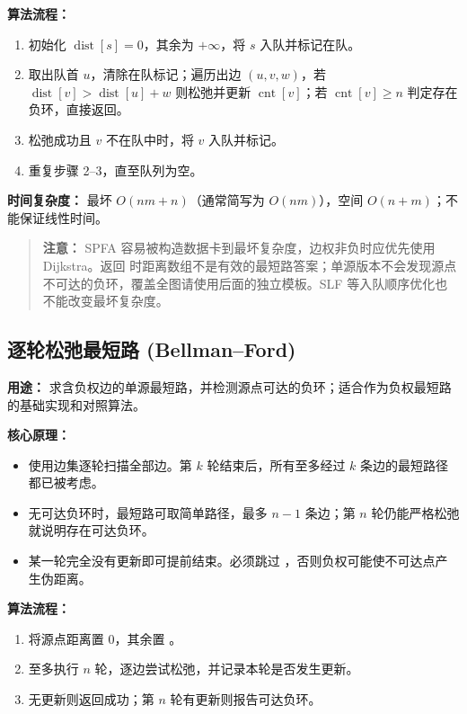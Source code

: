 \textbf{算法流程：}

\begin{enumerate}
  \item 初始化 $\operatorname{dist}[s] = 0$，其余为 $+\infty$，将 $s$ 入队并标记在队。
  \item 取出队首 $u$，清除在队标记；遍历出边 $(u, v, w)$，若 $\operatorname{dist}[v] > \operatorname{dist}[u] + w$ 则松弛并更新 $\operatorname{cnt}[v]$；若 $\operatorname{cnt}[v] \ge n$ 判定存在负环，直接返回。
  \item 松弛成功且 $v$ 不在队中时，将 $v$ 入队并标记。
  \item 重复步骤 2--3，直至队列为空。
\end{enumerate}

\textbf{时间复杂度：} 最坏 $O(nm+n)$（通常简写为 $O(nm)$），空间 $O(n+m)$；不能保证线性时间。

\begin{quote}
\textbf{注意：} SPFA 容易被构造数据卡到最坏复杂度，边权非负时应优先使用 Dijkstra。返回  时距离数组不是有效的最短路答案；单源版本不会发现源点不可达的负环，覆盖全图请使用后面的独立模板。SLF 等入队顺序优化也不能改变最坏复杂度。
\end{quote}



\subsection{逐轮松弛最短路 (Bellman--Ford)}

\textbf{用途：} 求含负权边的单源最短路，并检测源点可达的负环；适合作为负权最短路的基础实现和对照算法。

\textbf{核心原理：}
\begin{itemize}
  \item 使用边集逐轮扫描全部边。第 $k$ 轮结束后，所有至多经过 $k$ 条边的最短路径都已被考虑。
  \item 无可达负环时，最短路可取简单路径，最多 $n-1$ 条边；第 $n$ 轮仍能严格松弛就说明存在可达负环。
  \item 某一轮完全没有更新即可提前结束。必须跳过 ，否则负权可能使不可达点产生伪距离。
\end{itemize}

\textbf{算法流程：}
\begin{enumerate}
  \item 将源点距离置 $0$，其余置 。
  \item 至多执行 $n$ 轮，逐边尝试松弛，并记录本轮是否发生更新。
  \item 无更新则返回成功；第 $n$ 轮有更新则报告可达负环。
\end{enumerate}

